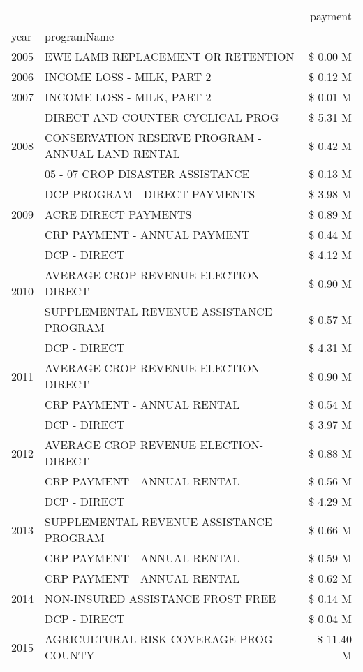 \begin{tabular}{llr}
\toprule
 &  & payment \\
year & programName &  \\
\midrule
2005 & EWE LAMB REPLACEMENT OR RETENTION & \$ 0.00 M \\
\cline{1-3}
2006 & INCOME LOSS - MILK, PART 2 & \$ 0.12 M \\
\cline{1-3}
2007 & INCOME LOSS - MILK, PART 2 & \$ 0.01 M \\
\cline{1-3}
\multirow[t]{3}{*}{2008} & DIRECT AND COUNTER CYCLICAL PROG & \$ 5.31 M \\
 & CONSERVATION RESERVE PROGRAM - ANNUAL LAND RENTAL & \$ 0.42 M \\
 & 05 - 07 CROP DISASTER ASSISTANCE & \$ 0.13 M \\
\cline{1-3}
\multirow[t]{3}{*}{2009} & DCP PROGRAM - DIRECT PAYMENTS & \$ 3.98 M \\
 & ACRE DIRECT PAYMENTS & \$ 0.89 M \\
 & CRP PAYMENT - ANNUAL PAYMENT & \$ 0.44 M \\
\cline{1-3}
\multirow[t]{3}{*}{2010} & DCP - DIRECT & \$ 4.12 M \\
 & AVERAGE CROP REVENUE ELECTION-DIRECT & \$ 0.90 M \\
 & SUPPLEMENTAL REVENUE ASSISTANCE PROGRAM & \$ 0.57 M \\
\cline{1-3}
\multirow[t]{3}{*}{2011} & DCP - DIRECT & \$ 4.31 M \\
 & AVERAGE CROP REVENUE ELECTION-DIRECT & \$ 0.90 M \\
 & CRP PAYMENT - ANNUAL RENTAL & \$ 0.54 M \\
\cline{1-3}
\multirow[t]{3}{*}{2012} & DCP - DIRECT & \$ 3.97 M \\
 & AVERAGE CROP REVENUE ELECTION-DIRECT & \$ 0.88 M \\
 & CRP PAYMENT - ANNUAL RENTAL & \$ 0.56 M \\
\cline{1-3}
\multirow[t]{3}{*}{2013} & DCP - DIRECT & \$ 4.29 M \\
 & SUPPLEMENTAL REVENUE ASSISTANCE PROGRAM & \$ 0.66 M \\
 & CRP PAYMENT - ANNUAL RENTAL & \$ 0.59 M \\
\cline{1-3}
\multirow[t]{3}{*}{2014} & CRP PAYMENT - ANNUAL RENTAL & \$ 0.62 M \\
 & NON-INSURED ASSISTANCE FROST FREE & \$ 0.14 M \\
 & DCP - DIRECT & \$ 0.04 M \\
\cline{1-3}
\multirow[t]{3}{*}{2015} & AGRICULTURAL RISK COVERAGE PROG - COUNTY & \$ 11.40 M \\

\end{tabular}
